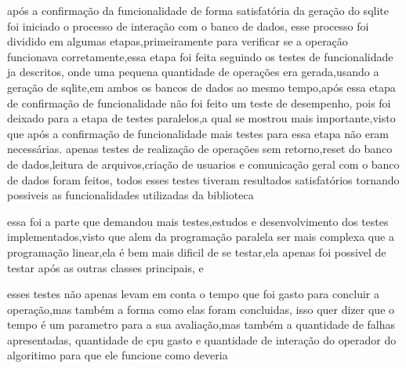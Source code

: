 \documentclass[
	12pt,				%
	openright,			%
	oneside,			%
	a4paper,			%
	english,			%
	french,				%
	spanish,			%
	brazil,				%
	]{abntex2}
\begin{document}
após a confirmação da funcionalidade de forma satisfatória da geração do sqlite foi iniciado o processo de interação com o banco de dados,
esse processo foi dividido em algumas etapas,primeiramente para verificar se a operação funcionava corretamente,essa etapa foi feita seguindo os testes de funcionalidade ja descritos,
onde uma pequena quantidade de operações era gerada,usando a geração de sqlite,em ambos os bancos de dados ao mesmo tempo,após essa etapa de confirmação de funcionalidade não foi feito um teste de desempenho,
pois foi deixado para a etapa de testes paralelos,a qual se mostrou mais importante,visto que após a confirmação de funcionalidade mais testes para essa etapa não eram necessárias.
apenas testes de realização de operações sem retorno,reset do banco de dados,leitura de arquivos,criação de usuarios e comunicação geral com o banco de dados foram feitos,
todos esses testes tiveram resultados satisfatórios tornando possiveis as funcionalidades utilizadas da biblioteca 

essa foi a parte que demandou mais testes,estudos e desenvolvimento dos testes implementados,visto que alem da programação paralela ser mais complexa que a programação linear,ela é bem mais dificil de se testar,ela apenas foi possivel de testar após as outras classes principais, e 

esses testes não apenas levam em conta o tempo que foi gasto para concluir a operação,mas também a forma como elas foram concluidas,
isso quer dizer que o tempo é um parametro para a sua avaliação,mas também a quantidade de falhas apresentadas,
quantidade de cpu gasto e quantidade de interação do operador do algoritimo para que ele funcione como deveria
\end{document}
